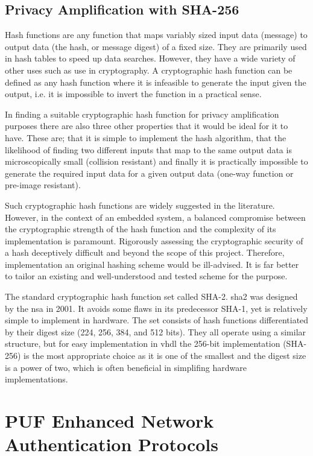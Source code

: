 \subsection{Privacy Amplification with SHA-256}

Hash functions are any function that maps variably sized input data (message) to
output data (the hash, or message digest) of a fixed size. They are primarily
used in hash tables to speed up data searches. However, they have a wide variety
of other uses such as use in cryptography. A cryptographic hash function can be
defined as any hash function where it is infeasible to generate the input given
the output, i.e. it is impossible to invert the function in a practical sense.

In finding a suitable cryptographic hash function for privacy amplification
purposes there are also three other properties that it would be ideal for it to
have. These are; that it is simple to implement the hash algorithm, that the
likelihood of finding two different inputs that map to the same output data is
microscopically small (collision resistant) and finally it is practically
impossible to generate the required input data for a given output data (one-way
function or pre-image resistant).

Such cryptographic hash functions are widely suggested in the literature.
However, in the context of an embedded system, a balanced compromise between
the cryptographic strength of the hash function and the complexity of its
implementation is paramount.  Rigorously assessing the cryptographic security
of a hash deceptively difficult and beyond the scope of this project.
Therefore, implementation an original hashing scheme would be ill-advised.
It is far better to tailor an existing and well-understood and tested scheme
for the purpose.

The standard cryptographic hash function set called SHA-2.
\gls{sha2} was designed by the \gls{nsa} in 2001.
It avoids some flaws in its predecessor SHA-1, yet is relatively simple
to implement in hardware. The set consists of hash functions differentiated by
their digest size (224, 256, 384, and 512 bits). They all operate using a
similar structure, but for easy implementation in \gls{vhdl} the 256-bit
implementation (SHA-256) is the most appropriate choice as it is one of the
smallest and the digest size is a power of two, which is often beneficial in
simplifing hardware implementations.


\section{PUF Enhanced Network Authentication Protocols}

